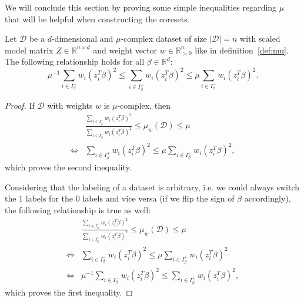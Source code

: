 We will conclude this section by proving some simple inequalities
regarding $\mu$ that will be helpful when constructing the
coresets.

\begin{lemma}
    \label{lemma:mu-inequalities}
    Let $\mathcal{D}$ be a $d$-dimensional and $\mu$-complex dataset of size
    $|\mathcal{D}|=n$ with scaled
    model matrix $Z \in \mathbb{R}^{n \times d}$ and weight
    vector $w \in \mathbb{R}^n_{>0}$ like in
    definition~\ref{def:mu}.
    The following relationship holds for all $\beta \in \mathbb{R}^d$:
    \begin{equation*}
        \mu^{-1} \sum_{i \in I_\beta^-} w_i (z_i^T \beta)^2
        \leq \sum_{i \in I_\beta^+} w_i (z_i^T \beta)^2
        \leq \mu \sum_{i \in I_\beta^-} w_i (z_i^T \beta)^2.
    \end{equation*}
\end{lemma}
\begin{proof}
    If $\mathcal{D}$ with weights $w$ is $\mu$-complex, then
    \begin{align*}
             & \frac{\sum_{i \in I_\beta^+} w_i (z_i^T \beta)^2}{\sum_{i \in I_\beta^-} w_i (z_i^T \beta)^2}
        \leq \mu_w(\mathcal{D}) \leq \mu                                                                     \\
        \iff &
        \sum_{i \in I_\beta^+} w_i (z_i^T \beta)^2
        \leq \mu \sum_{i \in I_\beta^-} w_i (z_i^T \beta)^2,
    \end{align*}
    which proves the second inequality.

    Considering that the labeling of a dataset is arbitrary, i.e. we
    could always switch the 1 labels for the 0 labels and vice versa
    (if we flip the sign of $\beta$
    accordingly),
    the following relationship is true as well:
    \begin{align*}
             & \frac{\sum_{i \in I_\beta^-} w_i (z_i^T \beta)^2}{\sum_{i \in I_\beta^+} w_i (z_i^T \beta)^2}
        \leq \mu_w(\mathcal{D}) \leq \mu                                                                     \\
        \iff &
        \sum_{i \in I_\beta^-} w_i (z_i^T \beta)^2
        \leq \mu \sum_{i \in I_\beta^+} w_i (z_i^T \beta)^2                                                  \\
        \iff &
        \mu^{-1} \sum_{i \in I_\beta^-} w_i (z_i^T \beta)^2
        \leq \sum_{i \in I_\beta^+} w_i (z_i^T \beta)^2,
    \end{align*}
    which proves the first inequality.
\end{proof}
